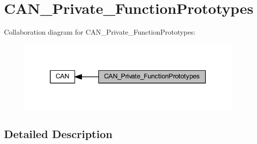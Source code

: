 \hypertarget{group___c_a_n___private___function_prototypes}{}\section{C\+A\+N\+\_\+\+Private\+\_\+\+Function\+Prototypes}
\label{group___c_a_n___private___function_prototypes}
Collaboration diagram for C\+A\+N\+\_\+\+Private\+\_\+\+Function\+Prototypes\+:
\nopagebreak
\begin{figure}[H]
\begin{center}
\leavevmode
\includegraphics[width=314pt]{group___c_a_n___private___function_prototypes}
\end{center}
\end{figure}


\subsection{Detailed Description}
